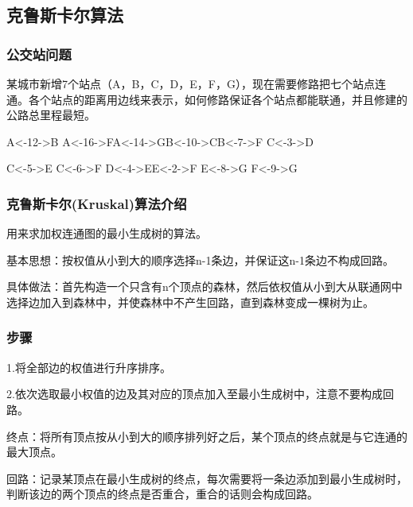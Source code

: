 \documentclass[a4paper]{report}
\begin{document}
\subsection{克鲁斯卡尔算法}
\subsubsection{公交站问题}
某城市新增7个站点（A，B，C，D，E，F，G），现在需要修路把七个站点连通。各个站点的距离用边线来表示，如何修路保证各个站点都能联通，并且修建的公路总里程最短。

\hphantom{~}\hfill A<-12->B \hfill A<-16->F\hfill A<-14->G\hfill B<-10->C\hfill B<-7->F \hfill C<-3->D \hfill\hphantom{~}

\hphantom{~}\hfill C<-5->E \hfill C<-6->F \hfill D<-4->E\hfill E<-2->F
 \hfill E<-8->G \hfill F<-9->G \hfill\hphantom{~}

\subsubsection{克鲁斯卡尔(Kruskal)算法介绍}
用来求加权连通图的最小生成树的算法。

基本思想：按权值从小到大的顺序选择n-1条边，并保证这n-1条边不构成回路。

具体做法：首先构造一个只含有n个顶点的森林，然后依权值从小到大从联通网中选择边加入到森林中，并使森林中不产生回路，直到森林变成一棵树为止。
\subsubsection{步骤}
1.将全部边的权值进行升序排序。

2.依次选取最小权值的边及其对应的顶点加入至最小生成树中，注意不要构成回路。

终点：将所有顶点按从小到大的顺序排列好之后，某个顶点的终点就是与它连通的最大顶点。

回路：记录某顶点在最小生成树的终点，每次需要将一条边添加到最小生成树时，判断该边的两个顶点的终点是否重合，重合的话则会构成回路。
\end{document}
